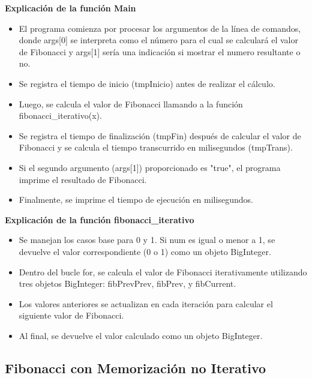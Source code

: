 \documentclass{article}
\begin{document}
            \textbf{Explicación de la función Main}\par  
            \begin{itemize}
                \item {El programa comienza por procesar los argumentos de la línea de comandos, donde args[0] se interpreta como el número para el cual se calculará el valor de Fibonacci y args[1] sería una indicación si mostrar el numero resultante o no.}
                \item {Se registra el tiempo de inicio (tmpInicio) antes de realizar el cálculo.}
                \item {Luego, se calcula el valor de Fibonacci llamando a la función fibonacci\_iterativo(x).}
                \item {Se registra el tiempo de finalización (tmpFin) después de calcular el valor de Fibonacci y se calcula el tiempo transcurrido en milisegundos (tmpTrans).}
                \item {Si el segundo argumento (args[1]) proporcionado es "true", el programa imprime el resultado de Fibonacci.}
                \item {Finalmente, se imprime el tiempo de ejecución en milisegundos.}
            \end{itemize}
            
            \textbf{Explicación de la función fibonacci\_iterativo}\par  
            \begin{itemize}
                \item {Se manejan los casos base para 0 y 1. Si num es igual o menor a 1, se devuelve el valor correspondiente (0 o 1) como un objeto BigInteger.}
                \item {Dentro del bucle for, se calcula el valor de Fibonacci iterativamente utilizando tres objetos BigInteger: fibPrevPrev, fibPrev, y fibCurrent.}
                \item {Los valores anteriores se actualizan en cada iteración para calcular el siguiente valor de Fibonacci.}
                \item {Al final, se devuelve el valor calculado como un objeto BigInteger.}
            \end{itemize}
        
        \subsection{Fibonacci con Memorización no Iterativo}
\end{document}
